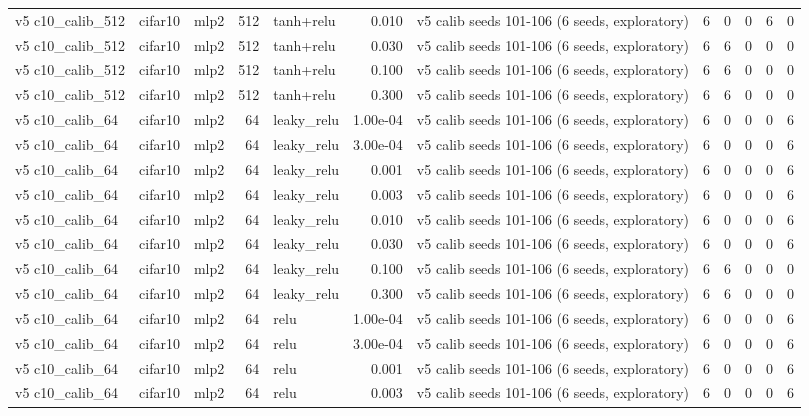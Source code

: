 \begin{table}[htbp]
{\begin{tabular}{@{}lllrlrlrrrrr@{}}
v5 c10\_calib\_512 & cifar10 & mlp2 & 512 & tanh+relu & 0.010 & v5 calib seeds 101-106 (6 seeds, exploratory) & 6 & 0 & 0 & 6 & 0 \\
v5 c10\_calib\_512 & cifar10 & mlp2 & 512 & tanh+relu & 0.030 & v5 calib seeds 101-106 (6 seeds, exploratory) & 6 & 6 & 0 & 0 & 0 \\
v5 c10\_calib\_512 & cifar10 & mlp2 & 512 & tanh+relu & 0.100 & v5 calib seeds 101-106 (6 seeds, exploratory) & 6 & 6 & 0 & 0 & 0 \\
v5 c10\_calib\_512 & cifar10 & mlp2 & 512 & tanh+relu & 0.300 & v5 calib seeds 101-106 (6 seeds, exploratory) & 6 & 6 & 0 & 0 & 0 \\
v5 c10\_calib\_64 & cifar10 & mlp2 & 64 & leaky\_relu & 1.00e-04 & v5 calib seeds 101-106 (6 seeds, exploratory) & 6 & 0 & 0 & 0 & 6 \\
v5 c10\_calib\_64 & cifar10 & mlp2 & 64 & leaky\_relu & 3.00e-04 & v5 calib seeds 101-106 (6 seeds, exploratory) & 6 & 0 & 0 & 0 & 6 \\
v5 c10\_calib\_64 & cifar10 & mlp2 & 64 & leaky\_relu & 0.001 & v5 calib seeds 101-106 (6 seeds, exploratory) & 6 & 0 & 0 & 0 & 6 \\
v5 c10\_calib\_64 & cifar10 & mlp2 & 64 & leaky\_relu & 0.003 & v5 calib seeds 101-106 (6 seeds, exploratory) & 6 & 0 & 0 & 0 & 6 \\
v5 c10\_calib\_64 & cifar10 & mlp2 & 64 & leaky\_relu & 0.010 & v5 calib seeds 101-106 (6 seeds, exploratory) & 6 & 0 & 0 & 0 & 6 \\
v5 c10\_calib\_64 & cifar10 & mlp2 & 64 & leaky\_relu & 0.030 & v5 calib seeds 101-106 (6 seeds, exploratory) & 6 & 0 & 0 & 0 & 6 \\
v5 c10\_calib\_64 & cifar10 & mlp2 & 64 & leaky\_relu & 0.100 & v5 calib seeds 101-106 (6 seeds, exploratory) & 6 & 6 & 0 & 0 & 0 \\
v5 c10\_calib\_64 & cifar10 & mlp2 & 64 & leaky\_relu & 0.300 & v5 calib seeds 101-106 (6 seeds, exploratory) & 6 & 6 & 0 & 0 & 0 \\
v5 c10\_calib\_64 & cifar10 & mlp2 & 64 & relu & 1.00e-04 & v5 calib seeds 101-106 (6 seeds, exploratory) & 6 & 0 & 0 & 0 & 6 \\
v5 c10\_calib\_64 & cifar10 & mlp2 & 64 & relu & 3.00e-04 & v5 calib seeds 101-106 (6 seeds, exploratory) & 6 & 0 & 0 & 0 & 6 \\
v5 c10\_calib\_64 & cifar10 & mlp2 & 64 & relu & 0.001 & v5 calib seeds 101-106 (6 seeds, exploratory) & 6 & 0 & 0 & 0 & 6 \\
v5 c10\_calib\_64 & cifar10 & mlp2 & 64 & relu & 0.003 & v5 calib seeds 101-106 (6 seeds, exploratory) & 6 & 0 & 0 & 0 & 6 \\

\end{tabular}}
\end{table}
